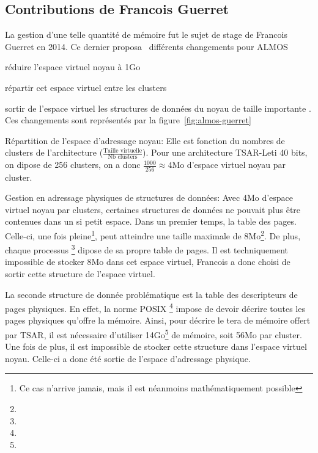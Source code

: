       
    \subsection{Contributions de Francois Guerret}
      
      La gestion d'une telle quantité de mémoire fut le sujet de stage de
      Francois Guerret en 2014. Ce dernier
      proposa~\cite{guerret2014exploitation} différents changements pour ALMOS
      \benumline \item réduire l'espace virtuel noyau à 1Go \item répartir cet
      espace virtuel entre les clusters \item sortir de l'espace virtuel les
      structures de données du noyau de taille importante \eenumline. Ces
      changements sont représentés par la figure~\ref{fig:almos-guerret}

      \begin{paragraph}{Répartition de l'espace d'adressage noyau:}
        Elle est fonction du nombres de clusters de l'architecture
        ($\frac{\text{Taille virtuelle}}{\text{Nb clusters}}$). Pour une
        architecture TSAR-Leti 40 bits, on dipose de 256 clusters, on a donc
        $\frac{1000}{256}\approx4$Mo d'espace virtuel noyau par cluster.
      \end{paragraph}
      \begin{paragraph}{Gestion en adressage physiques de structures de données:}
        Avec 4Mo d'espace virtuel noyau par clusters, certaines structures de
        données ne pouvait plus être contenues dans un si petit espace. Dans un
        premier temps, la table des pages. Celle-ci, une fois pleine\footnote{Ce
          cas n'arrive jamais, mais il est néanmoins mathématiquement possible},
        peut atteindre une taille maximale de 8Mo\footnote{}. De plus, chaque
        processus \footnote{}  dipose de sa
        propre table de pages. Il est techniquement impossible de stocker 8Mo
        dans cet espace virtuel, Francois a donc choisi de sortir cette
        structure de l'espace virtuel.

        La seconde structure de donnée problématique est la table des
        descripteurs de pages physiques. En effet, la norme POSIX
        \footnote{} impose de devoir décrire toutes les pages physiques qu'offre
        la mémoire. Ainsi, pour décrire le tera de mémoire offert par TSAR, il
        est nécessaire d'utiliser 14Go\footnote{} de mémoire, soit 56Mo par cluster. Une fois de plus, il
        est impossible de stocker cette structure dans l'espace virtuel
        noyau. Celle-ci a donc été sortie de l'espace d'adressage physique.
      \end{paragraph}


